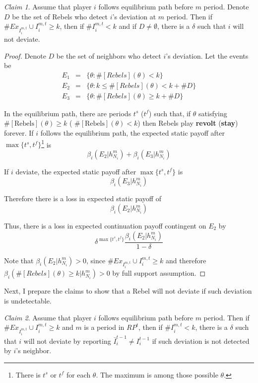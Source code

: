 \documentclass[12pt,letter]{article}
\theoremstyle{definition}
\theoremstyle{remark}
\theoremstyle{claim}
\newtheorem{claim}{Claim}
\begin{document}
\begin{claim} 
\label{claim_detection_reporting_period}
Assume that player $i$ follows equilibrium path before $m$ period. Denote $D$ be the set of Rebels who detect $i$'s deviation at $m$ period. Then if $\#Ex_{I^{m,t}_i}\cup I^{m,t}_i\geq k$, then if $\# I^{m,t}_i<k$ and if $D\neq \emptyset$, there is a $\delta$ such that $i$ will not deviate.
\end{claim}
\begin{proof}

Denote $D$ be the set of neighbors who detect $i$'s deviation. Let the events be
\begin{eqnarray*}
E_1 	&= &\{\theta: \#[Rebels](\theta)< k\}\\
E_2 	&= &\{\theta: k\leq \#[Rebels](\theta)<k+\# D\}\\
E_3 	&= &\{\theta: \#[Rebels](\theta)\geq k+\# D\}
\end{eqnarray*}

In the equilibrium path, there are periods $t^{s}$ ($t^{f}$) such that, if $\theta$ satisfying $\#[\text{Rebels}](\theta)\geq k$ ( $\#[\text{Rebels}](\theta)< k$) then Rebels play \textbf{revolt} (\textbf{stay}) forever. If $i$ follows the equilibrium path, the expected static payoff after $\max\{t^s,t^f\}$\footnote{There is $t^{s}$ or $t^{f}$ for each $\theta$. The maximum is among those possible $\theta$.} is
 \[\beta_{i}(E_2|h^{m}_{N_i})+\beta_{i}(E_3|h^{m}_{N_i})\]

If $i$ deviate, the expected static payoff after $\max\{t^s,t^f\}$ is
 \[\beta_{i}(E_3|h^{m}_{N_i})\]
 
Therefore there is a loss in expected static payoff of
\[\beta_{i}(E_2|h^{m}_{N_i})\]

Thus, there is a loss in expected continuation payoff contingent on $E_2$ by
\[\delta^{\max\{t^s,t^f\}}\frac{\beta_{i}(E_2|h^{m}_{N_i})}{1-\delta}\]

Note that $\beta_{i}(E_2|h^{m}_{N_i})>0$, since $\#Ex_{I^{m,t}_i}\cup I^{m,t}_i\geq k$ and therefore $\beta_{i}(\#[Rebels](\theta)\geq k|h^{m}_{N_i})>0$ by full support assumption.
\end{proof}


Next, I prepare the claims to show that a Rebel will not deviate if such deviation is undetectable.

\begin{claim} 
\label{claim_deviation_higher_reporting}
Assume that player $i$ follows equilibrium path before $m$ period. Then if $\# Ex_{I^{m,t}_i}\cup I^{m,t}_i \geq k$ and $m$ is a period in $RP^t$, then if $\# I^{m,t}_i<k$,  there is a $\delta$ such that $i$ will not deviate by reporting $\bar{I}^{t-1}_i\neq I^{t-1}_i$ if such deviation is not detected by $i$'s neighbor.
\end{claim}
\end{document}
